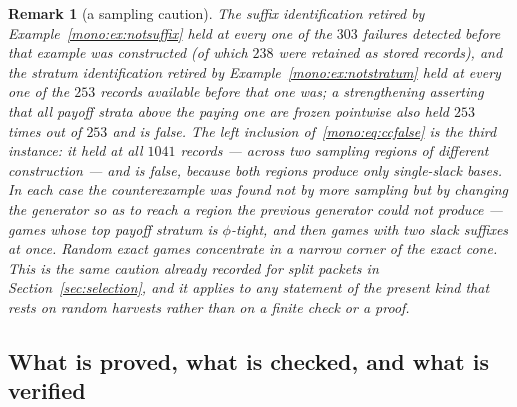 \documentclass[11pt]{article}
\newtheorem{remark}[theorem]{Remark}
\begin{document}
\begin{remark}[a sampling caution]\label{mono:rem:sampling}
The suffix identification retired by Example~\ref{mono:ex:notsuffix} held at
every one of the $303$ failures detected before that example was
constructed (of which $238$ were retained as stored records), and the
stratum identification retired by Example~\ref{mono:ex:notstratum} held at
every one of the $253$ records available before \emph{that} one was; a strengthening asserting that all payoff strata
above the paying one are frozen pointwise also held $253$ times out of $253$
and is false.  The left inclusion of~\eqref{mono:eq:ccfalse} is the third
instance: it held at all $1041$ records --- across \emph{two} sampling
regions of different construction --- and is false, because both regions
produce only single-slack bases.  In each case the counterexample was found
not by more sampling
but by changing the generator so as to reach a region the previous generator
could not produce --- games whose top payoff stratum is $\phi$-tight, and
then games with two slack suffixes at once.
Random exact games concentrate in a narrow corner of the exact cone.  This is
the same caution already recorded for split packets in
Section~\ref{sec:selection}, and it applies to any statement of the present
kind that rests on random harvests rather than on a finite check or a proof.
\end{remark}

\subsection{What is proved, what is checked, and what is verified}
\end{document}
